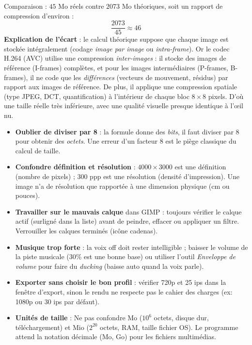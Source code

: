 \documentclass[11pt]{article}
\begin{document}
\begin{exoresolu}
Comparaison : $45$ Mo réels contre $2073$ Mo théoriques, soit un rapport de compression d'environ :
\[ \frac{2073}{45} \approx 46 \]
\textbf{Explication de l'écart} : le calcul théorique suppose que chaque image est stockée intégralement (codage \emph{image par image} ou \emph{intra-frame}). Or le codec H.264 (AVC) utilise une compression \emph{inter-images} : il stocke des images de référence (I-frames) complètes, et pour les images intermédiaires (P-frames, B-frames), il ne code que les \emph{différences} (vecteurs de mouvement, résidus) par rapport aux images de référence. De plus, il applique une compression spatiale (type JPEG, DCT, quantification) à l'intérieur de chaque bloc $8\times8$ pixels. D'où une taille réelle très inférieure, avec une qualité visuelle presque identique à l'œil nu.

\end{exoresolu}

\begin{attention}
\begin{itemize}
  \item \textbf{Oublier de diviser par 8} : la formule donne des \emph{bits}, il faut diviser par 8 pour obtenir des \emph{octets}. Une erreur d'un facteur 8 est le piège classique du calcul de taille.
  \item \textbf{Confondre définition et résolution} : $4000 \times 3000$ est une définition (nombre de pixels) ; 300 ppp est une résolution (densité d'impression). Une image n'a de résolution que rapportée à une dimension physique (cm ou pouces).
  \item \textbf{Travailler sur le mauvais calque} dans GIMP : toujours vérifier le calque actif (surligné dans la liste) avant de peindre, effacer ou appliquer un filtre. Verrouiller les calques terminés (icône cadenas).
  \item \textbf{Musique trop forte} : la voix off doit rester intelligible ; baisser le volume de la piste musicale (30\% est une bonne base) ou utiliser l'outil \emph{Enveloppe de volume} pour faire du \emph{ducking} (baisse auto quand la voix parle).
  \item \textbf{Exporter sans choisir le bon profil} : vérifier 720p et 25 ips dans la fenêtre d'export, sinon le rendu ne respecte pas le cahier des charges (ex: 1080p ou 30 ips par défaut).
  \item \textbf{Unités de taille} : Ne pas confondre Mo ($10^6$ octets, disque dur, téléchargement) et Mio ($2^{20}$ octets, RAM, taille fichier OS). Le programme attend la notation décimale (Mo, Go) pour les fichiers multimédias.
\end{itemize}
\end{attention}
\end{document}
